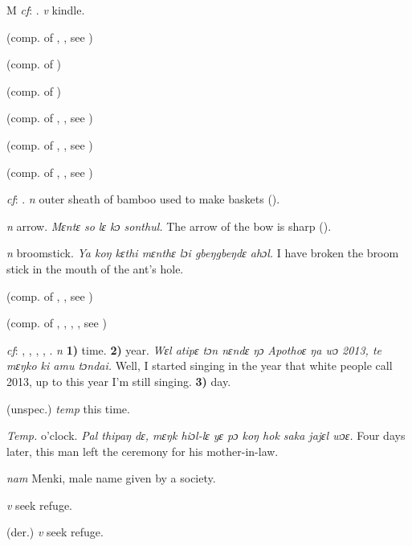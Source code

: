 \begin{letter}{M}
 \textit{cf}: . \textit{v} kindle.

 (comp. of , , see ) 

 (comp. of ) 

 (comp. of ) 

 (comp. of , , see ) 

 (comp. of , , see ) 

 (comp. of , , see )

 \textit{cf}: . \textit{n} outer sheath of bamboo used to make baskets (\citealt{Pichl1967}). 

 \textit{n} arrow. \textit{Mɛntɛ so lɛ kɔ sonthul.} The arrow of the bow is sharp (\citealt{Pichl1967}). 

 \textit{n} broomstick. \textit{Ya koŋ kɛthi mɛnthɛ lɔi gbeŋgbeŋdɛ ahɔl.} I have broken the broom stick in the mouth of the ant's hole.

 (comp. of , , see ) 

 (comp. of , , , , see ) 

 \textit{cf}: , , , , . \textit{n} \textbf{1)} time. \textbf{2)} year. \textit{Wɛl atipɛ tɔn nɛndɛ ŋɔ Apothoɛ ŋa wɔ 2013, te mɛŋko ki amu tɔndai.} Well, I started singing in the year that white people call 2013, up to this year I'm still singing. \textbf{3)} day.

 (unspec.) \textit{temp} this time.

 \textit{Temp.} o'clock. \textit{Pal thipaŋ dɛ, mɛŋk hiɔl-lɛ yɛ pɔ koŋ hok saka jajɛl wɔɛ.} Four days later, this man left the ceremony for his mother-in-law.

 \textit{nam} Menki, male name given by a society.

 \textit{v} seek refuge.

 (der.) \textit{v} seek refuge.


\end{letter}
